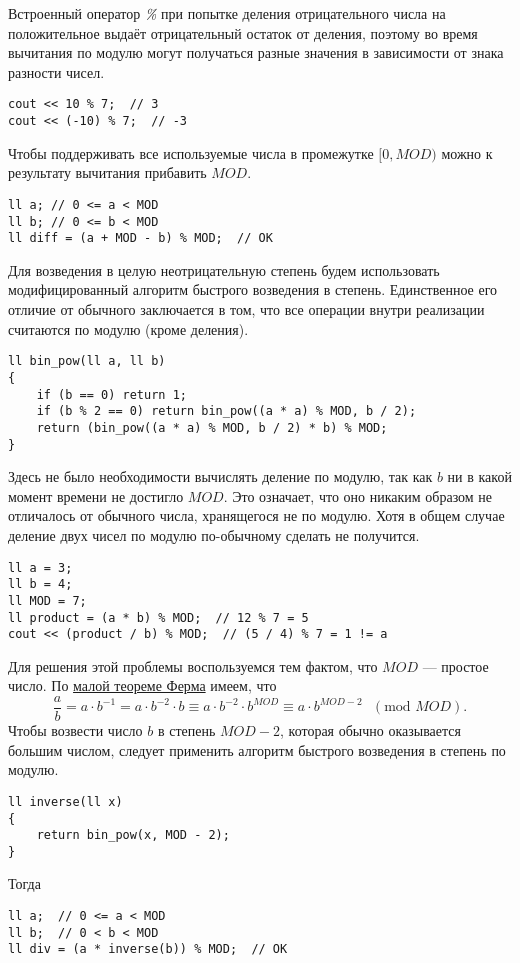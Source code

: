 \documentclass[a4paper,8pt]{article}
\begin{document}
    Встроенный оператор \textit{\%} при попытке деления отрицательного числа на положительное выдаёт отрицательный остаток от деления, поэтому во время вычитания по модулю могут получаться разные значения в зависимости от знака разности чисел.
\begin{lstlisting}
cout << 10 % 7;  // 3
cout << (-10) % 7;  // -3
\end{lstlisting}
    Чтобы поддерживать все используемые числа в промежутке \([0, MOD)\) можно к результату вычитания прибавить $MOD$.
\begin{lstlisting}
ll a; // 0 <= a < MOD
ll b; // 0 <= b < MOD
ll diff = (a + MOD - b) % MOD;  // OK
\end{lstlisting}

    Для возведения в целую неотрицательную степень будем использовать модифицированный алгоритм быстрого возведения в степень. Единственное его отличие от обычного заключается в том, что все операции внутри реализации считаются по модулю (кроме деления).
\begin{lstlisting}
ll bin_pow(ll a, ll b)
{
    if (b == 0) return 1;
    if (b % 2 == 0) return bin_pow((a * a) % MOD, b / 2);
    return (bin_pow((a * a) % MOD, b / 2) * b) % MOD;
}
\end{lstlisting}

    Здесь не было необходимости вычислять деление по модулю, так как $b$ ни в какой момент времени не достигло $MOD$. Это означает, что оно никаким образом не отличалось от обычного числа, хранящегося не по модулю. Хотя в общем случае деление двух чисел по модулю по-обычному сделать не получится.
\begin{lstlisting}
ll a = 3;
ll b = 4;
ll MOD = 7;
ll product = (a * b) % MOD;  // 12 % 7 = 5
cout << (product / b) % MOD;  // (5 / 4) % 7 = 1 != a
\end{lstlisting}
    Для решения этой проблемы воспользуемся тем фактом, что $MOD$ --- простое число. По \href{https://ru.wikipedia.org/wiki/%D0%9C%D0%B0%D0%BB%D0%B0%D1%8F_%D1%82%D0%B5%D0%BE%D1%80%D0%B5%D0%BC%D0%B0_%D0%A4%D0%B5%D1%80%D0%BC%D0%B0#%D0%90%D0%BB%D1%8C%D1%82%D0%B5%D1%80%D0%BD%D0%B0%D1%82%D0%B8%D0%B2%D0%BD%D0%B0%D1%8F_%D1%84%D0%BE%D1%80%D0%BC%D1%83%D0%BB%D0%B8%D1%80%D0%BE%D0%B2%D0%BA%D0%B0}{малой теореме Ферма} имеем, что
    \[\frac{a}{b} = a \cdot b^{-1} = a \cdot b^{-2} \cdot b \equiv a \cdot b^{-2} \cdot b^{MOD} \equiv a \cdot b^{MOD - 2} \text{ } (\text{mod } MOD).\]
    Чтобы возвести число $b$ в степень $MOD - 2$, которая обычно оказывается большим числом, следует применить алгоритм быстрого возведения в степень по модулю. 
\newpage
\begin{lstlisting}
ll inverse(ll x)
{
    return bin_pow(x, MOD - 2);
}
\end{lstlisting}
    Тогда
\begin{lstlisting}
ll a;  // 0 <= a < MOD
ll b;  // 0 < b < MOD
ll div = (a * inverse(b)) % MOD;  // OK
\end{lstlisting}
\end{document}
